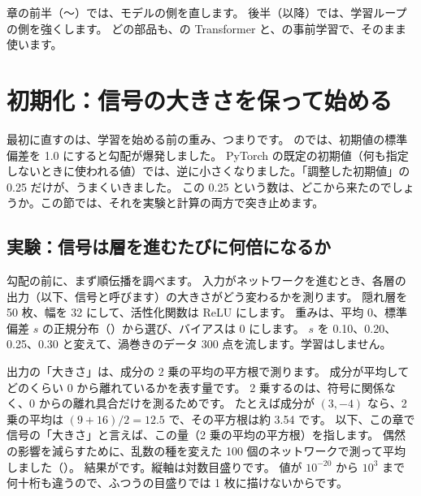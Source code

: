 章の前半（〜）では、モデルの側を直します。
後半（以降）では、学習ループの側を強くします。
どの部品も、の Transformer と、の事前学習で、そのまま使います。

\section{初期化：信号の大きさを保って始める}\label{sec:training-init}

最初に直すのは、学習を始める前の重み、つまりです。
のでは、初期値の標準偏差を 1.0 にすると勾配が爆発しました。
PyTorch の既定の初期値（何も指定しないときに使われる値）では、逆に小さくなりました。「調整した初期値」の 0.25 だけが、うまくいきました。
この 0.25 という数は、どこから来たのでしょうか。この節では、それを実験と計算の両方で突き止めます。

\subsection*{実験：信号は層を進むたびに何倍になるか}

勾配の前に、まず順伝播を調べます。
入力がネットワークを進むとき、各層の出力（以下、信号と呼びます）の大きさがどう変わるかを測ります。
隠れ層を 50 枚、幅を 32 にして、活性化関数は ReLU にします。
重みは、平均 0、標準偏差 $s$ の正規分布（）から選び、バイアスは 0 にします。
$s$ を 0.10、0.20、0.25、0.30 と変えて、渦巻きのデータ 300 点を流します。学習はしません。

出力の「大きさ」は、成分の 2 乗の平均の平方根で測ります。
成分が平均してどのくらい 0 から離れているかを表す量です。
2 乗するのは、符号に関係なく、0 からの離れ具合だけを測るためです。
たとえば成分が $(3,-4)$ なら、2 乗の平均は $(9+16)/2=12.5$ で、その平方根は約 3.54 です。
以下、この章で信号の「大きさ」と言えば、この量（2 乗の平均の平方根）を指します。
偶然の影響を減らすために、乱数の種を変えた 100 個のネットワークで測って平均しました（）。
結果がです。縦軸は対数目盛りです。
値が $10^{-20}$ から $10^{3}$ まで何十桁も違うので、ふつうの目盛りでは 1 枚に描けないからです。

